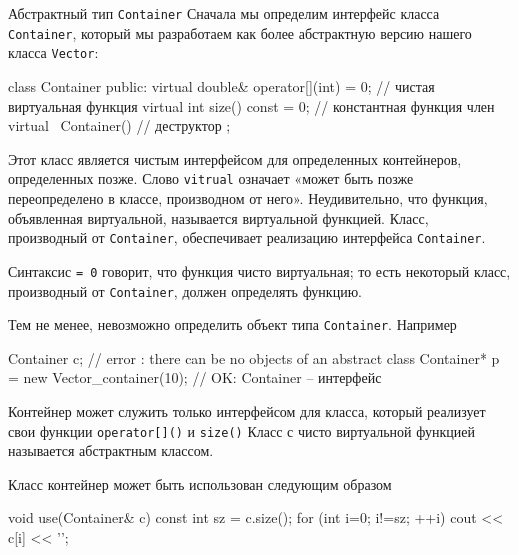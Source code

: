 \documentclass[
    8pt,
    hyperref={pdfencoding=unicode}
    ]{beamer}
\theoremstyle{definition}
\begin{document}
\begin{frame}{Абстрактный тип \texttt{Container}}
    Сначала мы определим интерфейс класса \texttt{Container}, который мы разработаем 
    как более абстрактную версию нашего класса \texttt{Vector}:
    \begin{cppcode}
        class Container {
            public:
            virtual double& operator[](int) = 0; // чистая виртуальная функция
            virtual int size() const = 0; // константная функция член
            virtual ~Container() {} // деструктор
        };
    \end{cppcode}

    Этот класс является чистым интерфейсом для определенных контейнеров, определенных позже.
    Слово \texttt{vitrual} означает «может быть позже переопределено в классе, производном от него». 
    Неудивительно, что функция, объявленная виртуальной, называется виртуальной функцией.
    Класс, производный от \texttt{Container}, обеспечивает реализацию интерфейса \texttt{Container}.
    
    \vspace{4mm}
    
    Синтаксис  \texttt{= 0} говорит, что функция чисто виртуальная; то есть некоторый класс, производный от \texttt{Container}, должен определять функцию.
    
    \newpage
    
    Тем не менее, невозможно определить объект типа \texttt{Container}. Например
    \begin{cppcode}
        Container c; // error : there can be no objects of an abstract class
        Container* p = new Vector_container(10); // OK: Container -- интерфейс
    \end{cppcode}
    
    Контейнер может служить только интерфейсом для класса, который реализует свои функции \texttt{operator[]()} и
    \texttt{size()}
    Класс с чисто виртуальной функцией называется абстрактным классом.
    
    \vspace{4mm}

    Класс контейнер может быть использован следующим образом
    \begin{cppcode}
        void use(Container& c)
        {
            const int sz = c.size();
            for (int i=0; i!=sz; ++i)
            cout << c[i] << '\n';
        }
    \end{cppcode}


\end{frame}
\end{document}
